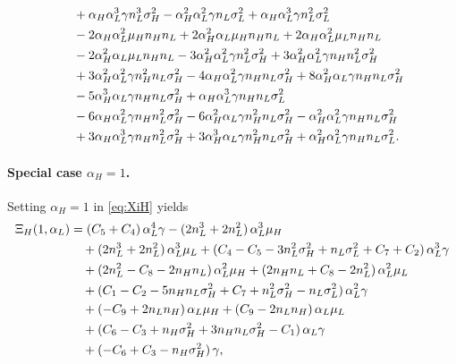 \documentclass[a4paper,12pt]{article}
\theoremstyle{definition}
\theoremstyle{remark}
\newcommand{\1}{\mathbf{1}}
\begin{document}
\begin{align}
    &\quad + \alpha_H \alpha_L^3 \gamma n_L^3 \sigma_H^2 - \alpha_H^2 \alpha_L^2 \gamma n_L \sigma_L^2 + \alpha_H \alpha_L^3 \gamma n_L^2 \sigma_L^2 \notag\\
    &\quad - 2 \alpha_H \alpha_L^2 \mu_H n_H n_L + 2 \alpha_H^2 \alpha_L \mu_H n_H n_L + 2 \alpha_H \alpha_L^2 \mu_L n_H n_L \notag\\
    &\quad - 2 \alpha_H^2 \alpha_L \mu_L n_H n_L - 3 \alpha_H^2 \alpha_L^2 \gamma n_L^2 \sigma_H^2 + 3 \alpha_H^2 \alpha_L^2 \gamma n_H n_L^2 \sigma_H^2 \notag\\
    &\quad + 3 \alpha_H^2 \alpha_L^2 \gamma n_H^2 n_L \sigma_H^2 - 4 \alpha_H \alpha_L^2 \gamma n_H n_L \sigma_H^2 + 8 \alpha_H^2 \alpha_L \gamma n_H n_L \sigma_H^2 \notag\\
    &\quad - 5 \alpha_H^3 \alpha_L \gamma n_H n_L \sigma_H^2 + \alpha_H \alpha_L^3 \gamma n_H n_L \sigma_L^2 \notag\\
    &\quad - 6 \alpha_H \alpha_L^2 \gamma n_H n_L^2 \sigma_H^2 - 6 \alpha_H^2 \alpha_L \gamma n_H^2 n_L \sigma_H^2 - \alpha_H^2 \alpha_L^2 \gamma n_H n_L \sigma_H^2 \notag\\
    &\quad + 3 \alpha_H \alpha_L^3 \gamma n_H n_L^2 \sigma_H^2 + 3 \alpha_H^3 \alpha_L \gamma n_H^2 n_L \sigma_H^2 + \alpha_H^2 \alpha_L^2 \gamma n_H n_L \sigma_L^2. \label{eq:XiH}
\end{align}

\paragraph{Special case $\alpha_H=1$.}
Setting $\alpha_H = 1$ in \eqref{eq:XiH} yields
\begin{align}
    \Xi_H(1,\alpha_L)
    &= (C_5 + C_4)\,\alpha_L^4 \gamma - (2 n_L^3 + 2 n_L^2)\,\alpha_L^3 \mu_H \notag\\
    &\quad + (2 n_L^3 + 2 n_L^2)\,\alpha_L^3 \mu_L + (C_4 - C_5 - 3 n_L^2 \sigma_H^2 + n_L \sigma_L^2 + C_7 + C_2)\,\alpha_L^3 \gamma \notag\\
    &\quad + (2 n_L^2 - C_8 - 2 n_H n_L)\,\alpha_L^2 \mu_H + (2 n_H n_L + C_8 - 2 n_L^2)\,\alpha_L^2 \mu_L \notag\\
    &\quad + (C_1 - C_2 - 5 n_H n_L \sigma_H^2 + C_7 + n_L^2 \sigma_H^2 - n_L \sigma_L^2)\,\alpha_L^2 \gamma \notag\\
    &\quad + (- C_9 + 2 n_L n_H)\,\alpha_L \mu_H + (C_9 - 2 n_L n_H)\,\alpha_L \mu_L \notag\\
    &\quad + (C_6 - C_3 + n_H \sigma_H^2 + 3 n_H n_L \sigma_H^2 - C_1)\,\alpha_L \gamma \notag\\
    &\quad + (- C_6 + C_3 - n_H \sigma_H^2)\,\gamma, \label{eq:XiH-special}
\end{align}
\end{document}
